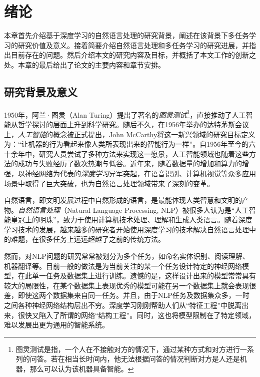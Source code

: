 \chapter{绪论}
\label{cha:intro}
本章首先介绍基于深度学习的自然语言处理的研究背景，阐述在该背景下多任务学习的研究价值及意义。接着简要介绍自然语言处理和多任务学习的研究进展，并指出目前存在的问题。然后介绍本文的研究内容及目标，并概括了本文工作的创新之处。本章的最后给出了论文的主要内容和章节安排。

\section{研究背景及意义}
1950年，阿兰·图灵（Alan Turing）提出了著名的\emph{图灵测试}\footnote{图灵测试是指，一个人在不接触对方的情况下，通过某种方式和对方进行一系列的问答。若在相当长时间内，他无法根据问答的情况判断对方是人还是机器，那么可以认为该机器具备智能。}，直接推动了人工智能从哲学探讨的层面上升到科学研究。随后不久，在1956年举办的达特茅斯会议上，\emph{人工智能}的概念被正式提出，John McCarthy将这一新兴领域的研究目标定义为：“让机器的行为看起来像人类所表现出来的智能行为一样”。自1956年至今的六十余年中，研究人员尝试了多种方法来实现这一愿景，人工智能领域也随着这些方法的成功与失败经历了数次热潮与低谷。近年来，随着数据量的增加和算力的增强，以神经网络为代表的\emph{深度学习}异军突起，在语音识别\cite{DBLP:conf/asru/MikolovDPBC11}\cite{DBLP:conf/apsipa/LiHYW13}、计算机视觉\cite{DBLP:journals/cacm/KrizhevskySH17}\cite{DBLP:journals/pami/FarabetCNL13}\cite{DBLP:conf/nips/TompsonJLB14}等众多应用场景中取得了巨大突破，也为自然语言处理领域带来了深刻的变革。

自然语言，即文明发展过程中自然形成的语言，是最能体现人类智慧和文明的产物。\emph{自然语言处理}（Natural Language Processing, NLP）被很多人认为是“人工智能皇冠上的明珠”，致力于使用计算机技术处理、理解和生成人类语言。随着深度学习技术的发展，越来越多的研究者开始使用深度学习的技术解决自然语言处理中的难题，在很多任务上远远超越了之前的传统方法\cite{DBLP:journals/jmlr/CollobertWBKKK11}\cite{DBLP:conf/emnlp/BordesCW14}\cite{DBLP:conf/acl/JeanCMB15}\cite{DBLP:conf/nips/SutskeverVL14}。

然而，对NLP问题的研究常常被划分为多个任务，如命名实体识别、阅读理解、机器翻译等。目前一般的做法是为当前关注的某一个任务设计特定的神经网络模型，在此单一任务及数据集上进行训练。遗憾的是，这样设计出来的模型常常具有较大的局限性，在某个数据集上表现优秀的模型可能在另一个数据集上就会表现很差，即使这两个数据集来自同一任务。并且，由于NLP任务及数据集众多，一时之间各种神经网络结构层出不穷。深度学习刚刚帮助人们从“特征工程”中脱离出来，很快又陷入了所谓的网络“结构工程”。同时，这也将模型限制在了特定领域，难以发展出更为通用的智能系统。

